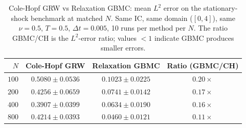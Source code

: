 \begin{table}[htbp]
\centering
\caption{Cole-Hopf GRW vs Relaxation GBMC: mean $L^2$ error on the stationary-shock benchmark at matched $N$.  Same IC, same domain ($[0,4]$), same $\nu=0.5$, $T=0.5$, $\Delta t=0.005$, 10 runs per method per $N$.  The ratio GBMC/CH is the $L^2$-error ratio; values $<1$ indicate GBMC produces smaller errors.}
\label{tab:comparison}
\begin{tabular}{r c c c}
\hline
$N$ & Cole-Hopf GRW & Relaxation GBMC & Ratio (GBMC/CH) \\
\hline
$100$ & $0.5080 \pm 0.0536$ & $0.1023 \pm 0.0225$ & $0.20\times$ \\
$200$ & $0.4256 \pm 0.0659$ & $0.0741 \pm 0.0142$ & $0.17\times$ \\
$400$ & $0.3907 \pm 0.0399$ & $0.0634 \pm 0.0190$ & $0.16\times$ \\
$800$ & $0.4214 \pm 0.0393$ & $0.0460 \pm 0.0121$ & $0.11\times$ \\
\hline
\end{tabular}
\end{table}
